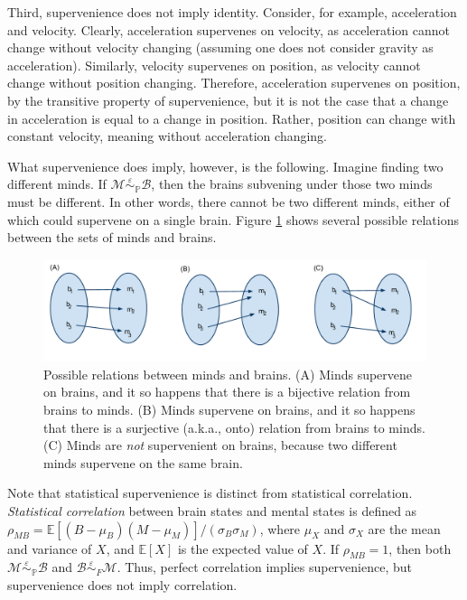 \documentclass{article}
\newcommand{\mB}{\mathcal{B}}
\newcommand{\mM}{\mathcal{M}}
\newcommand{\PP}{\mathbb{P}}           %
\newcommand{\EE}{\mathbb{E}}           %
\newcommand{\sig}{\sigma}
\newcommand{\MeB}{\mM \overset{\varepsilon}{{\sim}}_{\PP} \mB}
\begin{document}
Third, supervenience does not imply identity.  Consider, for example, acceleration and velocity.  Clearly, acceleration supervenes on velocity, as acceleration cannot change without velocity changing (assuming one does not consider gravity as acceleration).  Similarly, velocity supervenes on position, as velocity cannot change without position changing.  Therefore, acceleration supervenes on position, by the transitive property of supervenience, but it is not the case that a change in acceleration is equal to a change in position.  Rather, position can change with constant velocity, meaning without acceleration changing.  

What supervenience does imply, however, is the following.   Imagine finding two different minds.  If $\MeB$, then the brains subvening under those two minds must be different.  In other words, there cannot be two different minds, either of which could supervene on a single brain.  Figure \ref{fig:rel} shows several possible relations between the sets of minds and brains.

\begin{figure}[htbp]
	\centering
		\includegraphics[width=1\linewidth]{supervenience_relations.pdf}
	\caption{Possible relations between minds and brains.  (A) Minds supervene on brains, and it so happens that there is a bijective relation from brains to minds.  (B) Minds supervene on brains, and it so happens that there is a surjective (a.k.a., onto) relation from brains to minds. (C) Minds are \emph{not} supervenient on brains, because two different minds supervene on the same brain.}
	\label{fig:rel}
\end{figure}

Note that statistical supervenience is distinct from statistical correlation.  \emph{Statistical correlation} between brain states and mental states is defined as $\rho_{MB}=\EE[(B-\mu_B)(M-\mu_M)]/(\sig_B \sig_M)$, where $\mu_X$ and $\sig_X$ are the mean and variance of $X$, and $\EE[X]$ is the expected value of $X$.  If $\rho_{MB}=1$, then both $\MeB$ and $\mB \overset{\varepsilon}{{\sim}}_F \mM$. Thus, perfect correlation implies supervenience, but supervenience does not imply correlation.  
\end{document}
